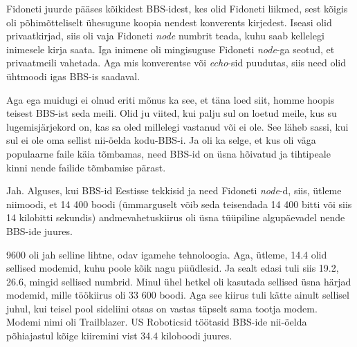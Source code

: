 
Fidoneti juurde pääses kõikidest BBS-idest, kes olid Fidoneti liikmed, sest kõigis oli põhimõtteliselt ühesugune koopia nendest konverents kirjedest. Iseasi olid privaatkirjad, siis oli  vaja Fidoneti \emph{node} numbrit teada, kuhu saab kellelegi inimesele kirja saata. Iga inimene oli  mingisuguse Fidoneti \emph{node}-ga seotud, et  privaatmeili vahetada. Aga mis konverentse või \emph{echo}-sid puudutas,  siis need  olid ühtmoodi igas BBS-is  saadaval.

Aga ega muidugi ei olnud eriti mõnus ka see, et täna loed siit, homme  hoopis teisest BBS-ist seda meili. Olid ju viited, kui palju sul on loetud meile, kus su lugemisjärjekord on, kas sa oled millelegi vastanud või ei ole. See  läheb sassi, kui sul ei ole oma sellist nii-öelda kodu-BBS-i. Ja oli ka selge, et kus oli väga populaarne faile käia tõmbamas,  need BBS-id on  üsna hõivatud ja tihtipeale kinni nende failide tõmbamise pärast. 


Jah. Alguses, kui BBS-id Eestisse tekkisid ja need Fidoneti \emph{node}-d, siis, ütleme niimoodi, et 14 400 boodi (ümmarguselt võib seda teisendada 14 400 bitti või siis 14 kilobitti sekundis) andmevahetuskiirus oli üsna tüüpiline  algupäevadel nende BBS-ide juures.


9600 oli jah selline lihtne, odav igamehe tehnoloogia. Aga, ütleme, 14.4 olid sellised modemid, kuhu poole kõik nagu püüdlesid. Ja sealt edasi tuli siis 19.2, 26.6, mingid sellised numbrid. Minul ühel hetkel oli kasutada sellised üsna  härjad modemid, mille töökiirus oli 33 600 boodi. Aga see kiirus tuli kätte ainult sellisel juhul, kui teisel pool sideliini otsas on vastas täpselt sama tootja modem. Modemi  nimi oli Trailblazer. US Roboticsid  töötasid BBS-ide nii-öelda  põhiajastul kõige kiiremini vist 34.4 kiloboodi juures.


